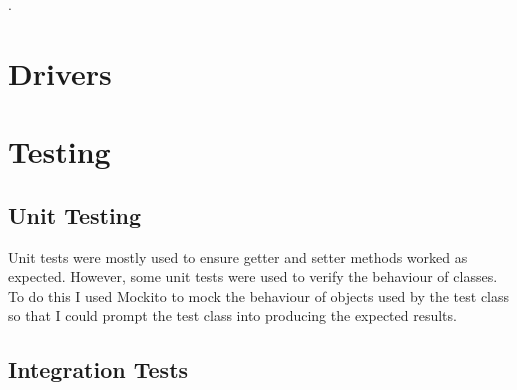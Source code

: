 .

\section{Drivers}
\label{sec:Drivers}


\section{Testing}
\label{sec:Testing}

\subsection{Unit Testing}
\label{subsec:Unit Testing}
Unit tests were mostly used to ensure getter and setter methods worked as expected. However, some unit tests were used to verify the behaviour of classes. To do this I used Mockito \citep{MockitoWebsite} to mock the behaviour of objects used by the test class so that I could prompt the test class into producing the expected results.

\subsection{Integration Tests}
\label{subsec:Integration Tests}

